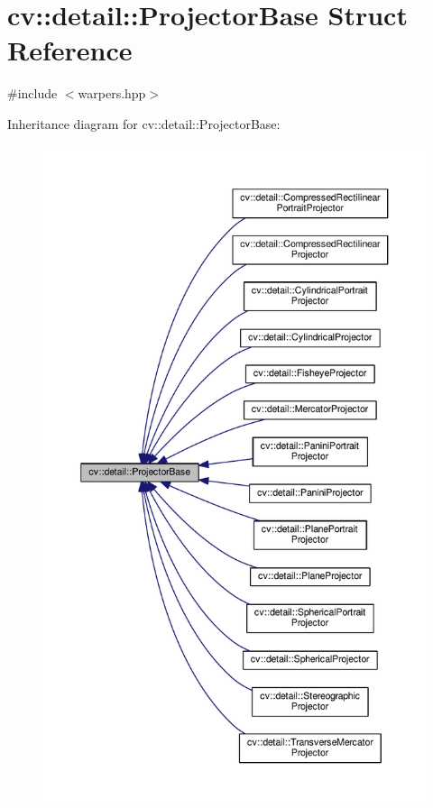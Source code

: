 \hypertarget{structcv_1_1detail_1_1ProjectorBase}{\section{cv\-:\-:detail\-:\-:Projector\-Base Struct Reference}
\label{structcv_1_1detail_1_1ProjectorBase}
}


{\ttfamily \#include $<$warpers.\-hpp$>$}



Inheritance diagram for cv\-:\-:detail\-:\-:Projector\-Base\-:\nopagebreak
\begin{figure}[H]
\begin{center}
\leavevmode
\includegraphics[height=550pt]{structcv_1_1detail_1_1ProjectorBase__inherit__graph}
\end{center}
\end{figure}

